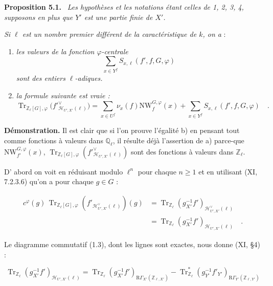 \documentclass[11pt]{article}
\newenvironment{statement}[1]{\par\medskip\noindent\textbf{#1.}\ }{\par\medskip}
\newcommand{\R}{\mathrm{R}}\newcommand{\RHomCore}{\mathrm{RHom}}
\newcommand{\Q}{\mathbb{Q}}
\providecommand{\Tr}{\operatorname{Tr}}
\providecommand{\Tr}{\operatorname{Tr}}
\providecommand{\Tr}{\operatorname{Tr}}
\providecommand{\R}{\mathrm R}
\providecommand{\Tr}{\operatorname{Tr}}
\providecommand{\bZ}{\mathbb Z}
\providecommand{\Tr}{\operatorname{Tr}}
\begin{document}
\begin{statement}{Proposition 5.1}
\emph{Les hypothèses et les notations étant celles de 1, 2, 3, 4, supposons en plus que $Y'$ est une partie finie de $X'$.}

\emph{Si $\ell$ est un nombre premier différent de la caractéristique de $k$, on a} :
\begin{enumerate}[label=\alph*)]
\item \emph{les valeurs de la fonction $\varphi$-centrale}
\[
\sum_{x\in Y^f} S_{x,\ell}(f',f,G,\varphi)
\]
\emph{sont des entiers $\ell$-adiques.}
\item \emph{la formule suivante est vraie :}
\begin{equation}\tag{5.1.1}
\Tr_{\bZ_\ell[G],\varphi}\bigl(f'^\vee_{\mathcal{H}_{U',X'}(\ell)}\bigr)
= \sum_{x\in U^f}\nu_x(f)\mathrm{NW}^{G,\varphi}_f(x)+\sum_{x\in Y^f}S_{x,\ell}(f',f,G,\varphi) \quad .
\end{equation}
\end{enumerate}
\end{statement}

\noindent
\textbf{Démonstration.} Il est clair que si l'on prouve l'égalité b) en pensant tout comme fonctions à valeurs dans $\Q_\ell$, il résulte déjà l'assertion de a) parce-que $\mathrm{NW}^{G,\varphi}_{f'}(x)$, $\Tr_{\bZ_\ell[G],\varphi}(f'^\vee_{\mathcal{H}_{U',X'}(\ell)})$ sont des fonctions à valeurs dans $\bZ_\ell$.

D'%
abord on voit en réduisant modulo $\ell^n$ pour chaque $n \geq 1$ et en utilisant (XI, 7.2.3.6) qu'on a pour chaque $g \in G$ :

\begin{equation}\tag{5.2}
\begin{aligned}
c^\varphi(g) \, \Tr_{\bZ_\ell[G],\varphi}(f'_{\mathcal{H}^\vee_{U',X'}(\ell)})(g)
&= \Tr_{\bZ_\ell}(g_{X'}^{-1}f')_{\mathcal{H}^\vee_{U',X'}(\ell)}\\
&= \Tr_{\bZ_\ell}(g_{X'}^{-1}f')_{\mathcal{H}_{U',X'}(\ell)} \quad .
\end{aligned}
\end{equation}

Le diagramme commutatif (1.3), dont les lignes sont exactes, nous donne (XI, \S4) :

\begin{equation}\tag{5.3}
\Tr_{\bZ_\ell}(g_{X'}^{-1}f')_{\mathcal{H}_{U',X'}(\ell)} = \Tr_{\bZ_\ell}(g_{X'}^{-1}f')_{\R\Gamma_{X'}(\bZ_{\ell,X'})} - \Tr^*_{\bZ_\ell}(g_{Y'}^{-1}f'_{Y'})_{\R\Gamma_{Y'}(\bZ_{\ell,Y'})}
\end{equation}
\end{document}
